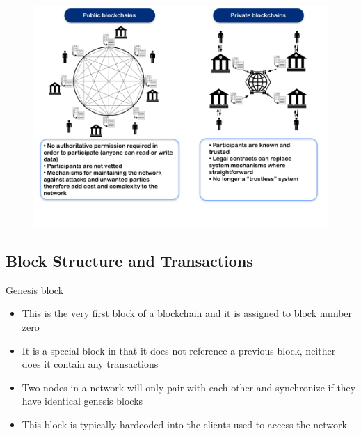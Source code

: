 \documentclass[11pt]{beamer}
\begin{document}

\begin{frame}
	\begin{figure}[]
		\centering
		\includegraphics  [scale=0.3]{Images/pvt}
	\end{figure}
\end{frame}

\subsection{Block Structure and Transactions}


\begin{frame}{Genesis block}
	\begin{itemize}
		\item This is the very first block of a blockchain and it is assigned to block number zero
		\item It is a special block in that it does not reference a previous block, neither does it contain any transactions
		\item Two nodes in a network will only pair with each other and synchronize if they have identical genesis blocks
		\item This block is typically hardcoded into the clients used to access the network
	\end{itemize}
\end{frame}

\end{document}
